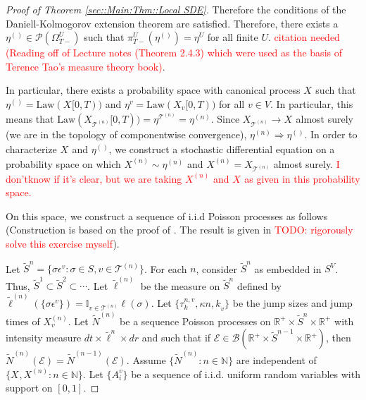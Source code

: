 \documentclass[12pt]{article}
\newcommand{\mb}{\mathbb}
\newcommand{\mc}{\mathcal}
\newcommand{\ms}{\mathscr}
\newcommand{\ra}{\rightarrow}
\newcommand{\te}{\text}
\newcommand{\ep}{\epsilon}
\newcommand{\tr}{\textcolor{red}}
\newcommand{\ind}{\hspace{24pt}}
\renewcommand{\v}{v}							%
\renewcommand{\U}{U}							%
\renewcommand{\S}{S}							%
\newcommand{\s}{\sigma}							%
\newcommand{\ev}{\ep}							%
\newcommand{\T}{T}								%
\renewcommand{\t}{t}							%
\newcommand{\sset}{\Omega}						%
\newcommand{\proj}{\pi}							%
\newcommand{\X}{X}								%
\newcommand{\vind}[1]{^{#1}}					%
\newcommand{\carp}[1]{^{#1}}					%
\newcommand{\vsi}[1]{^{#1}}						%
\newcommand{\cind}[1]{_{#1}}					%
\newcommand{\tip}[1]{#1}						%
\newcommand{\ts}[1]{_{#1}}						%
\newcommand{\slnvind}[2]{^{#1,#2}}				%
\newcommand{\tree}{\mc{T}}						%
\newcommand{\sln}[1]{^{(#1)}}					%
\newcommand{\poiss}{N}							%
\newcommand{\Sm}{\ell}							%
\renewcommand{\r}{r}							%
\newcommand{\alt}[1]{\widetilde{#1}}			%
\newcommand{\indx}[1]{_{#1}}					%
\newcommand{\mmm}{\eta}							%
\newcommand{\law}{\te{Law}}						%
\newcommand{\rt}{\tau}							%
\renewcommand{\it}{k}							%
\newcommand{\evnt}{\mc{E}}						%
\newcommand{\rv}{A}								%
\renewcommand{\mark}{\kappa}					%
\begin{document}
\begin{proof}[Proof of Theorem \ref{sec::Main:Thm::Local SDE}]
Therefore the conditions of the Daniell-Kolmogorov extension theorem are satisfied. Therefore, there exists a \(\mmm\sln{}\ts{}\in \ms{P}(\sset\vsi{\U}\ts{\T-})\) such that \(\proj\vsi{\U}\ts{\T-}(\mmm\sln{}\ts{}) =\mmm\vind{\U}\ts{}\) for all finite \(\U\). \tr{citation needed (Reading off of Lecture notes (Theorem 2.4.3) which were used as the basis of Terence Tao's measure theory book)}.

\ind In particular, there exists a probability space with canonical process \(\X\cind{}\tip{}\) such that \(\mmm\sln{}\ts{} = \law(\X\cind{}\tip{[0,\T)})\) and \(\mmm\vind{\v}\ts{} = \law(\X\cind{\v}\tip{[0,\T)})\) for all \(\v \in V\). In particular, this means that \(\law(\X\cind{\tree\sln{n}}\tip{[0,\T)}) = \mmm\vind{\tree\sln{n}}\ts{} = \mmm\sln{n}\ts{}\). Since \(\X\cind{\tree\sln{n}}\tip{} \ra \X\cind{}\tip{}\) almost surely (we are in the topology of componentwise convergence), \(\mmm\sln{n}\ts{} \Rightarrow \mmm\sln{}\ts{}\). In order to characterize \(\X\cind{}\tip{}\) and \(\mmm\sln{}\ts{}\), we construct a stochastic differential equation on a probability space on which \(\X\sln{n}\cind{}\tip{} \sim \mmm\sln{n}\ts{}\) and \(\X\sln{n}\cind{}\tip{} = \X\cind{\tree\sln{n}}\tip{}\) almost surely. \tr{I don'\t know if it's clear, but we are taking \(\X\sln{n}\cind{}\tip{}\) and \(\X\cind{}\tip{}\) as given in this probability space.}

\ind On this space, we construct a sequence of i.i.d Poisson processes as follows (Construction is based on the proof of \cite[Theorem 14.7.1(b)]{DalVer08}. The result is given in \cite[Exercise 14.7.1]{DalVer08} \tr{TODO: rigorously solve this exercise myself}).

\ind Let \(\alt{\S}^n = \{\s\ev\vind{\v}: \s\in\S,\v \in \tree\sln{n}\}\). For each \(n\), consider \(\alt{\S}^n\) as embedded in \(\S\carp{V}\). Thus, \(\alt{\S}^1 \subset \alt{\S}^2 \subset \cdots\). Let \(\alt{\Sm}\sln{n}\) be the measure on \(\alt{\S}^n\) defined by \(\alt{\Sm}\sln{n}(\{\s\ev\vind{\v}\}) = \mb{I}_{\v \in \tree\sln{n}}\Sm(\s)\). Let \(\{\rt\slnvind{n}{\v}\indx{\it},\mark{n,\it}_{\v}\}\) be the jump sizes and jump times of \(\X\sln{n}\cind{\v}\tip{}\). Let \(\alt{\poiss}\sln{n}\) be a sequence Poisson processes on \(\mb{R}^+\times\alt{\S}^n\times \mb{R}^+\) with intensity measure \(d\t\times\alt{\Sm}^n\times d\r\) and such that if \(\evnt \in \ms{B}(\mb{R}^+\times\alt{\S}^{n-1}\times \mb{R}^+)\), then \(\alt{\poiss}\sln{n}(\evnt) = \alt{\poiss}\sln{n-1}(\evnt)\). Assume \(\{\alt{\poiss}\sln{n}:n\in\mb{N}\}\) are independent of \(\{\X\cind{}\tip{},\X\sln{n}\cind{}\tip{}:n\in\mb{N}\}\). Let \(\{\rv\vind{\v}\indx{i}\}\) be a sequence of i.i.d. uniform random variables with support on \([0,1]\).


\end{proof}
\end{document}
